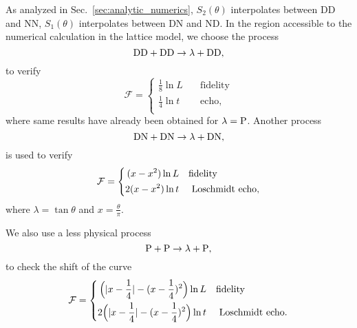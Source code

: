 As analyzed in Sec.~\ref{sec:analytic_numerics}, $S_2( \theta)$ interpolates between DD and NN, $S_1( \theta )$ interpolates between DN and ND. In the region accessible to the numerical calculation in the lattice model, we choose the process 
\begin{equation}
\label{eq:DDDD}
{\rm DD} + {\rm DD} \rightarrow  \lambda + {\rm DD},
\end{equation}
to verify
\begin{equation}
\label{eq:result_DDDD}
\mathcal{F} = 
\left\lbrace
\begin{aligned}
\frac{1}{8}\ln L  &\quad\text{fidelity}  \\
\frac{1}{4}\ln t   &\quad \text{echo} ,  \\
\end{aligned} \right.  
\end{equation}
where same results have already been obtained for $\lambda = {\rm P}$\cite{stephan_logarithmic_2013,stephan_local_2011,vasseur_universal_2014,vasseur_crossover_2013,kennes_universal_2014}. Another process
\begin{equation}
\label{eq:DNDN}
{\rm DN} + {\rm DN} \rightarrow \lambda + {\rm DN} ,
\end{equation}
is used to verify
\begin{equation}
\label{eq:result_DNDN}
\mathcal{F} = 
\left\lbrace
\begin{aligned}
 (x - x^2 )\ln L   &  \quad {\rm fidelity} \\
 2(x - x^2 ) \ln t  & \quad \text{ Loschmidt echo} , \\
\end{aligned} \right. 
\end{equation}
where $\lambda = \tan \theta$ and $x = \frac{\theta}{\pi}$. 

We also use a less physical process
\begin{equation}
  \label{eq:PP}
  {\rm P} + {\rm P} \rightarrow \lambda + {\rm P},
\end{equation}
to check the shift of the curve
\begin{equation}
\label{eq:periodic-case}
\mathcal{F} = 
\left\lbrace
\begin{aligned}
  \Big(|x-\frac{1}{4}| - (x-\frac{1}{4})^2 \Big)\ln L   &  \quad {\rm fidelity} \\
  2\Big(|x-\frac{1}{4}| - (x-\frac{1}{4})^2 \Big) \ln t  & \quad \text{ Loschmidt echo} .\\
\end{aligned} \right. 
\end{equation}



